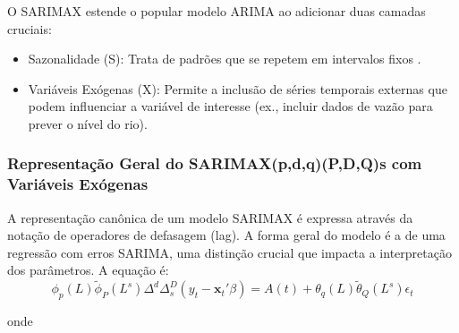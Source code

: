 \documentclass[ 12pt,a4paper ]{article} %
\begin{document}
	O SARIMAX estende o popular modelo ARIMA ao adicionar duas camadas cruciais:
	\begin{itemize}
		

	\item Sazonalidade (S): Trata de padrões que se repetem em intervalos fixos .
	
	\item Variáveis Exógenas (X): Permite a inclusão de séries temporais externas que podem influenciar a variável de interesse (ex., incluir dados de vazão para prever o nível do rio).
	\end{itemize}
	
	\subsubsection{Representação Geral do SARIMAX(p,d,q)(P,D,Q)s com Variáveis Exógenas}
	
	A representação canônica de um modelo SARIMAX é expressa através da notação de operadores de defasagem (lag). A forma geral do modelo é a de uma regressão com erros SARIMA, uma distinção crucial que impacta a interpretação dos parâmetros. A equação é:   
	$$ \phi_p(L) \tilde{\phi}_P(L^s) \Delta^d \Delta_s^D (y_t - \mathbf{x}_t'\beta) = A(t) + \theta_q(L) \tilde{\theta}_Q(L^s) \epsilon_t $$
	
	onde 
	
\end{document}
